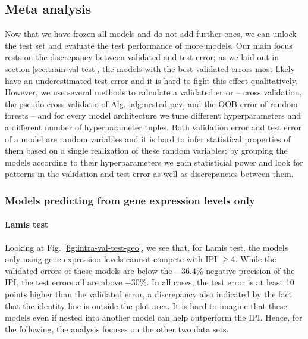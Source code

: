 \subsection{Meta analysis}

Now that we have frozen all models and do not add further ones, we can unlock the test set and 
evaluate the test performance of more models. Our main focus rests on the discrepancy between 
validated and test error; as we laid out in section \ref{sec:train-val-test}, the models with the 
best validated errors most likely have an underestimated test error and it is hard to fight this 
effect qualitatively. However, we use several methods to calculate a validated error -- cross 
validation, the pseudo cross validatio of Alg. \ref{alg:nested-pcv} and the OOB error of random 
forests -- and for every model architecture we tune different hyperparameters and a different 
number of hyperparameter tuples. Both validation error and test error of a model are random 
variables and it is hard to infer statistical properties of them based on a single realization of 
these random variables; by grouping the models according to their hyperparameters we gain 
statisticial power and look for patterns in the validation and test error as well as 
discrepancies between them.

\subsubsection{Models predicting from gene expression levels only}



\paragraph{Lamis test}
Looking at Fig. \ref{fig:intra-val-test-geo}, we see that, for Lamis test, the models only using 
gene expression levels cannot compete with IPI $\geq 4$. While the validated errors of these models are 
below the \num{-36.4}\% negative precision of the IPI, the test errors all are above \num{-30}\%. 
In all cases, the test error is at least 10 points higher than the validated error, a discrepancy 
also indicated by the fact that the identity line is outside the plot area. It is hard to imagine that 
these models even if nested into another model can help outperform the IPI. Hence, for the 
following, the analysis focuses on the other two data sets.

